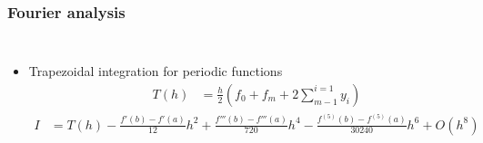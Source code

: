 \documentclass[aspectratio=1610]{beamer}
\begin{document}
\begin{frame}
\frametitle{Fourier analysis}
\begin{columns}
\column{37em}
\begin{itemize}
	\item<1-> Trapezoidal integration for periodic functions\\
 	 \begin{align*}
	 	 T(h)& = \frac{h}{2}\left(f_{0}+f_{m}+  2\sum_{m-1}^{i=1} y_{i}\right)
 	 \end{align*} 
	 \begin{align*}
	 I &= T(h)-\frac{f'(b)-f'(a)}{12}h^2+\frac{f'''(b)-f'''(a)}{720}h^4-\frac{f^{(5)}(b)-f^{(5)}(a)}{30240}h^6+O(h^8)
			\end{align*}
\end{itemize}

\end{columns}
\end{frame}
\end{document}
